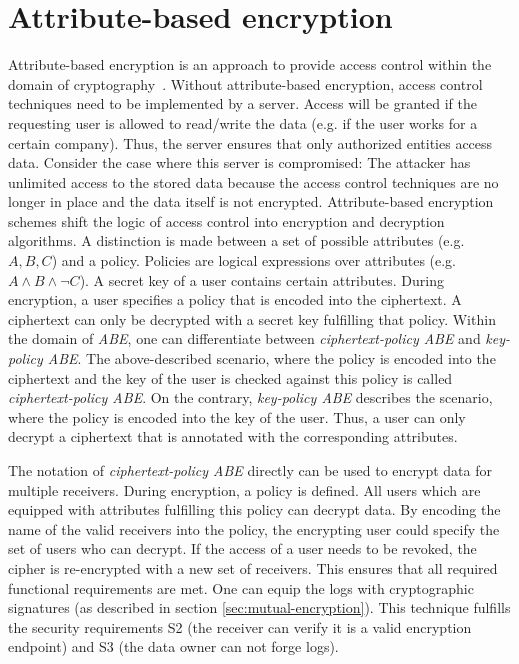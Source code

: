 \documentclass[../main.tex]{subfiles}
\begin{document}
\section{Attribute-based encryption}

Attribute-based encryption is an approach to provide access control within the domain of cryptography~\cite{Bethencourt2007}. 
Without attribute-based encryption, access control techniques need to be implemented by a server. 
Access will be granted if the requesting user is allowed to read/write the data (e.g. if the user works for a certain company). 
Thus, the server ensures that only authorized entities access data. 
Consider the case where this server is compromised: 
The attacker has unlimited access to the stored data because the access control techniques are no longer in place and the data itself is not encrypted.
Attribute-based encryption schemes shift the logic of access control into encryption and decryption algorithms. 
A distinction is made between a set of possible attributes (e.g. ${A,B,C}$) and a policy. 
Policies are logical expressions over attributes (e.g. $A \land B \land \neg C$). 
A secret key of a user contains certain attributes. 
During encryption, a user specifies a policy that is encoded into the ciphertext.
A ciphertext can only be decrypted with a secret key fulfilling that policy.
Within the domain of \textit{ABE}, one can differentiate between \textit{ciphertext-policy ABE} and \textit{key-policy ABE}. 
The above-described scenario, where the policy is encoded into the ciphertext and the key of the user is checked against this policy is called \textit{ciphertext-policy ABE}. 
On the contrary, \textit{key-policy ABE} describes the scenario, where the policy is encoded into the key of the user.
Thus, a user can only decrypt a ciphertext that is annotated with the corresponding attributes.~\cite{Bethencourt2007}

The notation of \textit{ciphertext-policy ABE} directly can be used to encrypt data for multiple receivers. 
During encryption, a policy is defined. 
All users which are equipped with attributes fulfilling this policy can decrypt data.
By encoding the name of the valid receivers into the policy, the encrypting user could specify the set of users who can decrypt.
If the access of a user needs to be revoked, the cipher is re-encrypted with a new set of receivers.
This ensures that all required functional requirements are met.
One can equip the logs with cryptographic signatures (as described in section \ref{sec:mutual-encryption}).
This technique fulfills the security requirements S2 (the receiver can verify it is a valid encryption endpoint) and S3 (the data owner can not forge logs).
\end{document}
